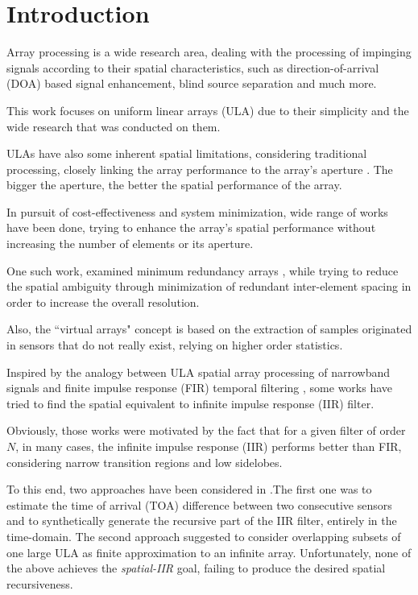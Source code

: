 \documentclass[conference]{IEEEtran}
\begin{document}
\section{Introduction}
Array processing is a wide research area, dealing with the processing of impinging signals according to their spatial characteristics, such as direction-of-arrival (DOA) based signal enhancement, blind source separation and much more.
\par This work focuses on uniform linear arrays (ULA) due to their simplicity and the wide research that was conducted on them. 
\par ULAs have also some inherent spatial limitations, considering traditional processing, closely linking the array performance to the array's aperture \cite{VanTrees2002DetectionIV}. 
The bigger the aperture, the better the spatial performance of the array.
\par In pursuit of cost-effectiveness and system minimization, wide range of works have been done, trying to enhance the array's spatial performance without increasing the number of elements or its aperture.
\par One such work, examined minimum redundancy arrays \cite{Moffet1968Minimum-RedundancyArrays,Pillai1985AEstimation,UnnikrishnaPillai1987StatisticalMatrix}, while trying to reduce the spatial ambiguity through minimization of redundant inter-element spacing in order to increase the overall resolution.
\par Also, the ``virtual arrays" \cite{Pal2010NestedFreedom,Chevalier2005OnProcessing,Mendel1999ApplicationsProcessing} concept is based on the extraction of samples originated in sensors that do not really exist, relying on higher order statistics.
\par Inspired by the analogy between ULA spatial array processing of narrowband signals and finite impulse response (FIR) temporal filtering \cite{VanVeenBeamforming:Filtering}, some works \cite{Wen2013ExtendingStructure,Madanayake2008AFilters,Madanayake2008ABeamformer} have tried to find the spatial equivalent to infinite impulse response (IIR) filter.
\par Obviously, those works were motivated by the fact that for a given filter of order $N$, in many cases, the infinite impulse response (IIR) performs better than FIR, considering narrow transition regions and low sidelobes.
\par To this end, two approaches have been considered in \cite{Wen2013ExtendingStructure}.The first one was to estimate the time of arrival (TOA) difference between two consecutive sensors and to synthetically generate the recursive part of the IIR filter, entirely in the time-domain. The second approach suggested to consider overlapping subsets of one large ULA as finite approximation to an infinite array. Unfortunately, none of the above achieves the \textit{spatial-IIR} goal, failing to produce the desired spatial recursiveness. 
\end{document}
